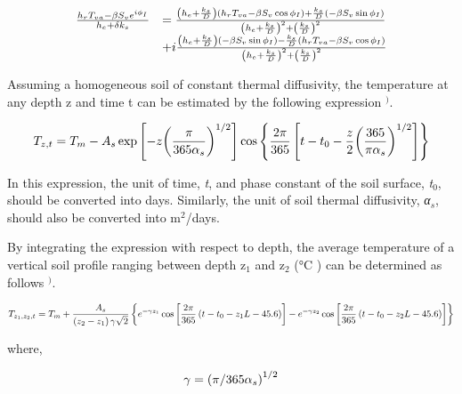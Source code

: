 \begin{equation}
  \begin{array}{ll}
    \frac{h_r T_{va} - \beta S_v e^{i \phi_I}}{h_e + \delta k_s} 
           &=  \frac{ \PB{h_e + \frac{k_s}{D}} \PB{ h_r T_{va} - \beta S_v \cos \phi_I} + \frac{k_s}{D} \PB{-\beta S_v \sin \phi_I}}{\PB{h_e + \frac{k_s}{D}}^2 + \PB{\frac{k_s}{D}}^2} \\
           &+ i\frac{ \PB{h_e + \frac{k_s}{D}} \PB{-\beta S_v \sin \phi_I} - \frac{k_s}{D} \PB{h_r T_{va} - \beta S_v \cos \phi_I}}{\PB{h_e + \frac{k_s}{D}}^2 + \PB{\frac{k_s}{D}}^2}
  \end{array}
\end{equation}

Assuming a homogeneous soil of constant thermal diffusivity, the temperature at any depth z and time t can be estimated by the following expression \(^{)}\).

\begin{equation}
{T_{z,t}} = {T_m} - {A_s}\exp \left[ { - z{{\left( {\frac{\pi }{{{\rm{365}}{\alpha_s}}}} \right)}^{1/2}}} \right]\cos \left\{ {\frac{{2\pi }}{{{\rm{365}}}}\left[ {t - {t_0} - \frac{z}{2}{{\left( {\frac{{{\rm{365}}}}{{\pi {\alpha_s}}}} \right)}^{1/2}}} \right]} \right\}
\end{equation}

In this expression, the unit of time, \emph{t}, and phase constant of the soil surface, \emph{t\(_{0}\)}, should be converted into days. Similarly, the unit of soil thermal diffusivity, \emph{α\(_{s}\)}, should also be converted into m\(^{2}\)/days.

By integrating the expression with respect to depth, the average temperature of a vertical soil profile ranging between depth z\(_{1}\) and z\(_{2}\) (°C ) can be determined as follows \(^{)}\).

{\scriptsize
\begin{equation}
{T_{{z_1},{z_2},t}} = {T_m} + \frac{{{A_s}}}{{\left( {{z_2} - {z_1}} \right)\gamma \sqrt 2 }}\left\{ {{e^{ - \gamma {z_1}}}\cos \left[ {\frac{{2\pi }}{{{\rm{365}}}}\left( {t - {t_0} - {z_1}L - 45.6} \right)} \right] - {e^{ - \gamma {z_2}}}\cos \left[ {\frac{{2\pi }}{{{\rm{365}}}}\left( {t - {t_0} - {z_2}L - 45.6} \right)} \right]} \right\}
\end{equation}}

where,

\begin{equation}
\gamma  = {\left( {\pi /{\rm{365}}{\alpha_s}} \right)^{1/2}}
\end{equation}

